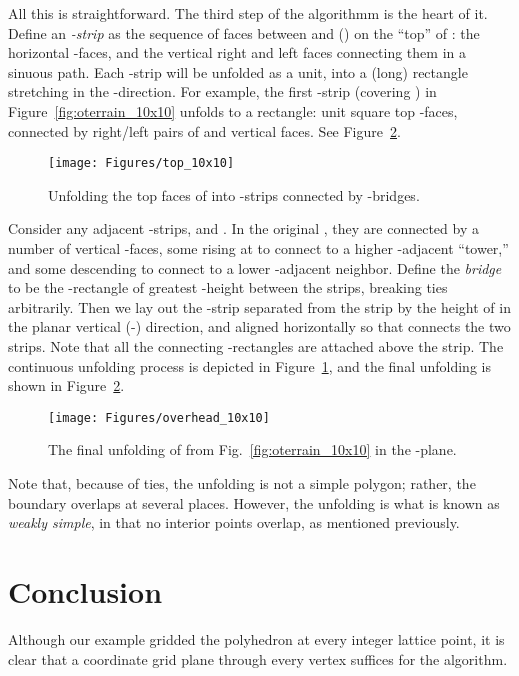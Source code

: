\pdfoutput=1  \documentclass[]{article}
\newcommand{\figlab}[1]{\label{fig:#1}}
\newcommand{\figref}[1]{\ref{fig:#1}}
\begin{document}
All this is straightforward.
The third step of the algorithmm is the heart of it.
Define an \emph{-strip} as the sequence of faces between
 and  () on the ``top'' of :
the horizontal -faces, and the vertical  right and left
faces connecting them in a sinuous path.  Each -strip will
be unfolded as a unit, into a (long) rectangle stretching in the -direction.
For example, the first -strip (covering ) in
Figure~\figref{oterrain_10x10} unfolds to
a  rectangle:  unit square top -faces, connected by right/left
pairs of  and  vertical faces.
See Figure~\figref{overhead_10x10}.
\begin{figure}[htbp]
\centering
\texttt{[image: Figures/top\_10x10]}
\caption{Unfolding the top faces of  
into -strips connected by -bridges.}
\figlab{top_10x10}
\end{figure}


Consider any adjacent -strips,  and .
In the original , they are connected by a number of vertical -faces,
some rising at  to connect to a higher -adjacent ``tower,'' 
and some descending to connect to a lower -adjacent neighbor.
Define the \emph{bridge}  to be the -rectangle of greatest -height
between the strips,
breaking ties arbitrarily.  Then we lay out the -strip 
separated from the  strip 
by the height of  in the planar vertical (-) direction, 
and 
aligned horizontally so that  connects the two strips.
Note that all the connecting -rectangles are attached above
the  strip.
The continuous unfolding process is depicted in 
Figure~\figref{top_10x10},
and the final unfolding is shown in 
Figure~\figref{overhead_10x10}.
\begin{figure}[htbp]
\centering
\texttt{[image: Figures/overhead\_10x10]}
\caption{The final unfolding of  from Fig.~\protect\figref{oterrain_10x10} in
the -plane.}
\figlab{overhead_10x10}
\end{figure}
Note that, because of ties, the unfolding is not a simple polygon;
rather, the boundary overlaps at several places.
However, the unfolding is what is known as \emph{weakly simple}, in
that no interior points overlap, as mentioned previously.

\section{Conclusion}

Although our example gridded the polyhedron at every integer lattice point,
it is clear that a coordinate grid plane through every vertex suffices for the
algorithm.
\end{document}
